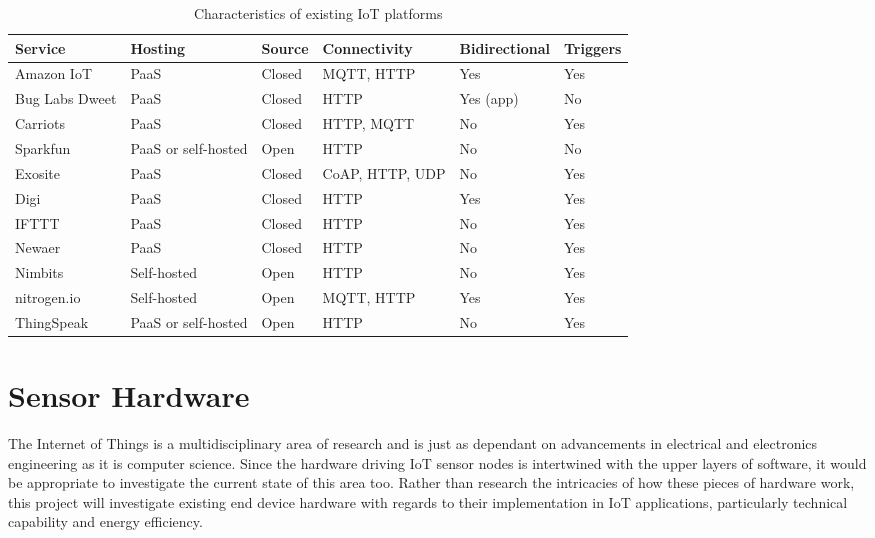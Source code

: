       \begin{table}
        \renewcommand{\arraystretch}{1.5}
        \scriptsize
        \begin{tabularx}{\textwidth}{|X|X|X|X|X|X|}
          \hline
          \textbf{Service} & \textbf{Hosting} & \textbf{Source} & \textbf{Connectivity} & \textbf{Bidirectional} & \textbf{Triggers} \\ \hline
          Amazon IoT & PaaS & Closed & MQTT, HTTP & Yes & Yes \\ \hline
          Bug Labs Dweet & PaaS & Closed & HTTP & Yes (app) & No \\ \hline
          Carriots & PaaS & Closed & HTTP, MQTT & No & Yes \\ \hline
          Sparkfun & PaaS or self-hosted & Open & HTTP & No & No \\ \hline
          Exosite & PaaS & Closed & CoAP, HTTP, UDP & No & Yes \\ \hline
          Digi & PaaS & Closed & HTTP & Yes & Yes \\ \hline
          IFTTT & PaaS & Closed & HTTP & No & Yes \\ \hline
          Newaer & PaaS & Closed & HTTP & No & Yes \\ \hline
          Nimbits & Self-hosted & Open & HTTP & No & Yes \\ \hline
          nitrogen.io & Self-hosted & Open & MQTT, HTTP & Yes & Yes \\ \hline
          ThingSpeak & PaaS or self-hosted & Open & HTTP & No & Yes \\ \hline
        \end{tabularx}
        \caption{Characteristics of existing IoT platforms}
        \label{platform-characteristics}
      \end{table}

  \section{Sensor Hardware}
  \label{sensor-hardware}
    The Internet of Things is a multidisciplinary area of research and is just as dependant on advancements in electrical and electronics engineering as it is computer science. Since the hardware driving IoT sensor nodes is intertwined with the upper layers of software, it would be appropriate to investigate the current state of this area too. Rather than research the intricacies of how these pieces of hardware work, this project will investigate existing end device hardware with regards to their implementation in IoT applications, particularly technical capability and energy efficiency.

